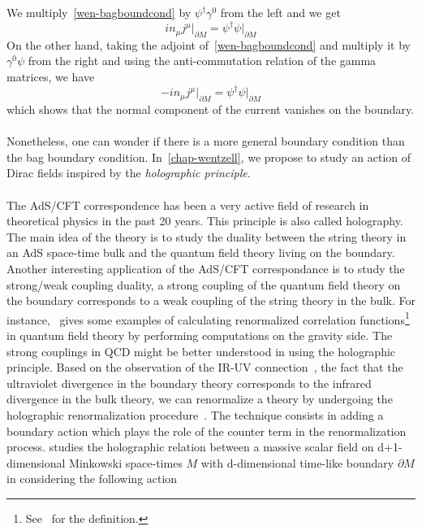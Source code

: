 We multiply~\cref{wen-bagboundcond} by $\psi^\dagger\gamma^0$ from the left and we get
\begin{equation*}
i n_\mu j^\mu \big\vert_{\partial M}= \psi^\dagger\psi \big\vert_{\partial M}
\end{equation*}
On the other hand, taking the adjoint of~\cref{wen-bagboundcond} and multiply it by $\gamma^0\psi$ from the right and using the anti-commutation relation of the gamma matrices, we have
\begin{equation*}
- i n_\mu j^\mu \big\vert_{\partial M} = \psi^\dagger\psi\big\vert_{\partial M}
\end{equation*}
which shows that the normal component of the current vanishes on the boundary. \\\\
Nonetheless, one can wonder if there is a more general boundary condition than the bag boundary condition. 
In~\cref{chap-wentzell}, we propose to study an action of Dirac fields inspired by the \textit{holographic principle}. \\\\
%
The AdS/CFT correspondence has been a very active field of research in theoretical physics in the past 20 years. 
This principle is also called holography.
The main idea of the theory is to study the duality between the string theory in an AdS space-time bulk and the quantum field theory living on the boundary.
Another interesting application of the AdS/CFT correspondance is to study the strong/weak coupling duality, \ie
a strong coupling of the quantum field theory on the boundary corresponds to a weak coupling of the string theory in the bulk. 
For instance,~\cite{Skenderis2002} gives some examples of calculating renormalized correlation functions\footnote{
See~\eg\cite{Peskin1995} for the definition.
} in quantum field theory by performing computations on the gravity side.
The strong couplings in QCD might be better understood in using the holographic principle. 
Based on the observation of the IR-UV connection~\cite{Susskind1998}, 
\ie the fact that the ultraviolet divergence in the boundary theory corresponds to the infrared divergence in the bulk theory, 
we can renormalize a theory by undergoing the holographic renormalization procedure~\cite{Skenderis2002}. 
The technique consists in adding a boundary action which plays the role of the counter term in the renormalization process.
\cite{Zahn2016} studies the holographic relation between a massive scalar field on d+1-dimensional Minkowski space-times $M$ with d-dimensional time-like boundary $\partial M$ in considering the following action
